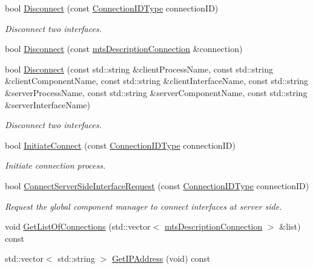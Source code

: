 \begin{DoxyCompactItemize}
bool \hyperlink{classmts_manager_global_a76821bdfa173c602a1e2822abbd30207}{Disconnect} (const \hyperlink{mts_forward_declarations_8h_ad3543bb11742e1766374ec96016d6547}{Connection\+I\+D\+Type} connection\+I\+D)
\begin{DoxyCompactList}\small\item\em Disconnect two interfaces. \end{DoxyCompactList}\item 
bool \hyperlink{classmts_manager_global_a8f1aacccac9488a3ec0aeb4ecc547c7c}{Disconnect} (const \hyperlink{classmts_description_connection}{mts\+Description\+Connection} \&connection)
\item 
bool \hyperlink{classmts_manager_global_abfa53d9b4051f79c7b413ce1fa2b8cc9}{Disconnect} (const std\+::string \&client\+Process\+Name, const std\+::string \&client\+Component\+Name, const std\+::string \&client\+Interface\+Name, const std\+::string \&server\+Process\+Name, const std\+::string \&server\+Component\+Name, const std\+::string \&server\+Interface\+Name)
\begin{DoxyCompactList}\small\item\em Disconnect two interfaces. \end{DoxyCompactList}\item 
bool \hyperlink{classmts_manager_global_a395aea7f5f6c28d676bd9f2d05b72ff6}{Initiate\+Connect} (const \hyperlink{mts_forward_declarations_8h_ad3543bb11742e1766374ec96016d6547}{Connection\+I\+D\+Type} connection\+I\+D)
\begin{DoxyCompactList}\small\item\em Initiate connection process. \end{DoxyCompactList}\item 
bool \hyperlink{classmts_manager_global_acf0a8009a35013ec30c1fddda725eb20}{Connect\+Server\+Side\+Interface\+Request} (const \hyperlink{mts_forward_declarations_8h_ad3543bb11742e1766374ec96016d6547}{Connection\+I\+D\+Type} connection\+I\+D)
\begin{DoxyCompactList}\small\item\em Request the global component manager to connect interfaces at server side. \end{DoxyCompactList}\item 
void \hyperlink{classmts_manager_global_ab53df6ad67125ff7682e5a091287d2ec}{Get\+List\+Of\+Connections} (std\+::vector$<$ \hyperlink{classmts_description_connection}{mts\+Description\+Connection} $>$ \&list) const 
\item 
std\+::vector$<$ std\+::string $>$ \hyperlink{classmts_manager_global_a9a61d5f94f5cef7bb85b4184fbb971cd}{Get\+I\+P\+Address} (void) const 

\end{DoxyCompactItemize}
